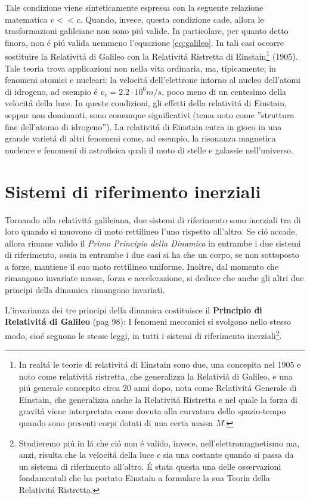 \documentclass[17pt]{extarticle}
\begin{document}
Tale condizione viene sinteticamente espressa con la seguente relazione matematica $v<<c$. Quando, invece, questa condizione cade, allora le trasformazioni galileiane non sono pi\'u valide. In particolare, per quanto detto finora, non \'e pi\'u valida nemmeno l'equazione  \ref{eq:galileo}. In tali casi occorre sostituire la Relativit\'a di Galileo con la Relativit\'a Ristretta di Einstain\footnote{In realt\'a le teorie di relativit\'a di Einstain sono due, una concepita nel 1905 e noto come relativit\'a ristretta, che generalizza la Relativi\'a di Galileo, e una pi\'u generale concepito circa 20 anni dopo, nota  come Relativit\'a Generale di Einstain, che generalizza anche la Relativit\'a Ristretta e nel quale la forza di gravit\'a viene interpretata come dovuta alla curvatura dello spazio-tempo quando sono presenti corpi dotati di una certa massa $M$.} (1905). Tale teoria trova applicazioni non nella vita ordinaria, ma, tipicamente, in fenomeni atomici e nucleari: la velocit\'a dell'elettrone intorno al nucleo dell'atomi di idrogeno, ad esempio \'e $v_e = 2.2\cdot 10^6 m/s$, poco meno di un centesimo della velocit\'a della luce. In queste condizioni, gli effetti della relativit\'a di Einstain, seppur non dominanti, sono comunque significativi (tema noto come ''struttura fine dell'atomo di idrogeno''). La relativit\'a di Einstain entra in gioco in una grande variet\'a di altri fenomeni come, ad esempio, la risonanza magnetica nucleare e fenomeni di astrofisica quali il moto di stelle e galassie nell'universo.


\section{Sistemi di riferimento inerziali}
	
Tornando alla relativit\'a galileiana, due sistemi di riferimento sono inerziali tra di loro quando si muovono di moto rettilineo l'uno rispetto all'altro. Se ci\'o accade, allora rimane valido il \emph{Primo Principio della Dinamica} in entrambe i due sistemi di riferimento, ossia in entrambe i due casi si ha che un corpo, se non sottoposto a forze, mantiene il suo moto rettilineo uniforme. Inoltre, dal momento che rimangono invariate massa, forza e accelerazione, si deduce che anche gli altri due principi della dinamica rimangono invariati.

L'invarianza dei tre principi della dinamica costituisce il {\bf Principio di Relativit\'a di Galileo}  (pag 98): I fenomeni meccanici si svolgono nello stesso modo, cio\'e seguono le stesse leggi, in tutti i sistemi di riferimento inerziali\footnote{Studieremo pi\'u in l\'a che ci\'o non \'e valido, invece, nell'elettromagnetismo ma, anzi, risulta che la velocit\'a della luce $c$ sia una costante quando si passa da un sistema di riferimento all'altro. \'E stata questa una delle osservazioni fondamentali che ha portato Einstain a formulare la sua Teoria della Relativit\'a Ristretta.}.
\end{document}
